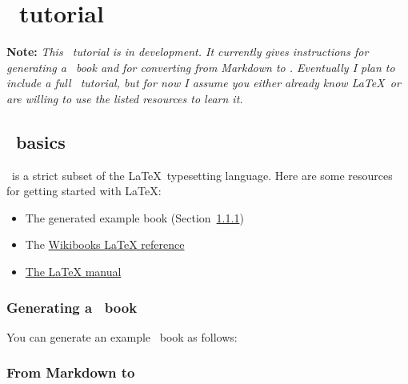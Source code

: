 \chapter{\PolyTeX\ tutorial} %
\label{cha:polytex_tutorial}

\noindent \textbf{Note:} \emph{This \PolyTeX\ tutorial is in development. It currently gives instructions for generating a \PolyTeX\ book and for converting from Markdown to \PolyTeX\@. Eventually I plan to include a full \PolyTeX\ tutorial, but for now I assume you either already know \LaTeX\ or are willing to use the listed resources to learn it.}

\section{\PolyTeX\ basics} %
\label{sec:polytex_basics}

\PolyTeX\ is a strict subset of the \LaTeX\ typesetting language. Here are some resources for getting started with \LaTeX:

\begin{itemize}
\item The generated example book (Section~\ref{sec:generating_a_polytex_book})
\item The \href{http://en.wikibooks.org/wiki/LaTeX}{Wikibooks LaTeX reference}
\item \href{https://www.google.com/search?q=latex+a+document+preparation+system+site:temple.edu}{The LaTeX manual}
\end{itemize}

\subsection{Generating a \PolyTeX\ book} %
\label{sec:generating_a_polytex_book}

You can generate an example \PolyTeX\ book as follows:



\subsection{From Markdown to \PolyTeX} %
\label{sec:markdown_to_polytex}

